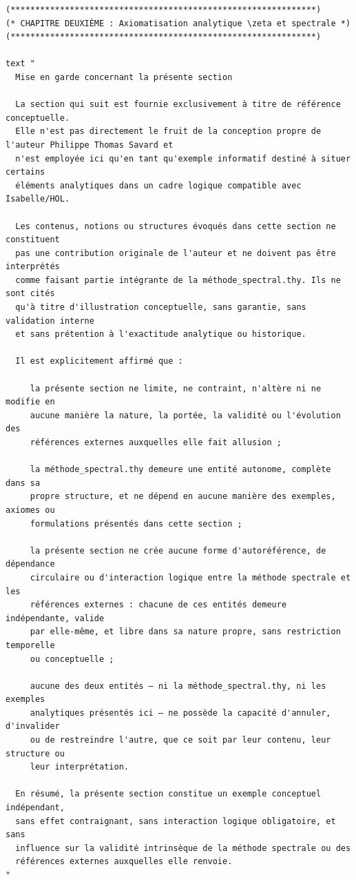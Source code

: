 \documentclass[a4paper,11pt]{article}
\begin{document}
\begin{holcode}[title={\textcolor{white}{File: methode\_spectral.thy -- Part 6/6 (END)}}]
\begin{lstlisting}
(**************************************************************)
(* CHAPITRE DEUXIÈME : Axiomatisation analytique \zeta et spectrale *)
(**************************************************************)

text "
  Mise en garde concernant la présente section

  La section qui suit est fournie exclusivement à titre de référence conceptuelle.
  Elle n'est pas directement le fruit de la conception propre de l'auteur Philippe Thomas Savard et
  n'est employée ici qu'en tant qu'exemple informatif destiné à situer certains
  éléments analytiques dans un cadre logique compatible avec Isabelle/HOL.

  Les contenus, notions ou structures évoqués dans cette section ne constituent
  pas une contribution originale de l'auteur et ne doivent pas être interprétés
  comme faisant partie intégrante de la méthode_spectral.thy. Ils ne sont cités
  qu'à titre d'illustration conceptuelle, sans garantie, sans validation interne
  et sans prétention à l'exactitude analytique ou historique.

  Il est explicitement affirmé que :

     la présente section ne limite, ne contraint, n'altère ni ne modifie en
     aucune manière la nature, la portée, la validité ou l'évolution des
     références externes auxquelles elle fait allusion ;

     la méthode_spectral.thy demeure une entité autonome, complète dans sa
     propre structure, et ne dépend en aucune manière des exemples, axiomes ou
     formulations présentés dans cette section ;

     la présente section ne crée aucune forme d'autoréférence, de dépendance
     circulaire ou d'interaction logique entre la méthode spectrale et les
     références externes : chacune de ces entités demeure indépendante, valide
     par elle-même, et libre dans sa nature propre, sans restriction temporelle
     ou conceptuelle ;

     aucune des deux entités — ni la méthode_spectral.thy, ni les exemples
     analytiques présentés ici — ne possède la capacité d'annuler, d'invalider
     ou de restreindre l'autre, que ce soit par leur contenu, leur structure ou
     leur interprétation.

  En résumé, la présente section constitue un exemple conceptuel indépendant,
  sans effet contraignant, sans interaction logique obligatoire, et sans
  influence sur la validité intrinsèque de la méthode spectrale ou des
  références externes auxquelles elle renvoie.
"


\end{lstlisting}
\end{holcode}
\end{document}
